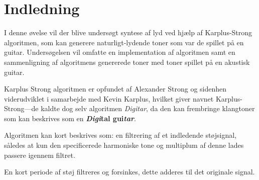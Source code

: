 \section{Indledning}

I denne øvelse vil der blive undersøgt syntese af lyd ved hjælp af Karplus-Strong algoritmen, som kan generere naturligt-lydende toner som var de spillet på en guitar.
Undersøgelsen vil omfatte en implementation af algoritmen samt en sammenligning af algoritmens genererede toner med toner spillet på en akustisk guitar.

Karplus Strong algoritmen er opfundet af Alexander Strong og sidenhen viderudviklet i samarbejde med Kevin Karplus\cite{Karplus1983}, hvilket giver navnet Karplus-Strong---de kaldte dog selv algoritmen \emph{Digitar}, da den kan frembringe klangtoner som kan beskrives som en \textbf{\emph{Digi}tal gui\emph{tar}}.

Algoritmen kan kort beskrives som: en filtrering af et indledende støjsignal, således at kun den specificerede harmoniske tone og multiplum af denne lades passere igennem filtret.

En kort periode af støj filtreres og forsinkes, dette adderes til  det originale signal.
